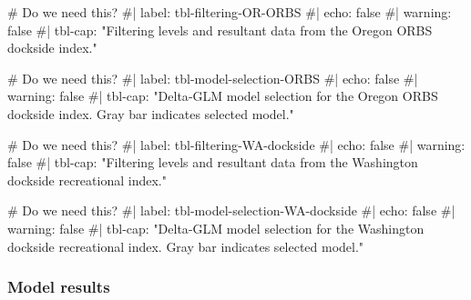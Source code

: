 \documentclass[
]{scrartcl}
\newenvironment{Shaded}{\begin{snugshade}}{\end{snugshade}}
\newcommand{\CommentTok}[1]{\textcolor[rgb]{0.37,0.37,0.37}{#1}}
\begin{document}
\begin{Shaded}
\begin{Highlighting}[]
\CommentTok{\# Do we need this?}
\CommentTok{\#| label: tbl{-}filtering{-}OR{-}ORBS}
\CommentTok{\#| echo: false}
\CommentTok{\#| warning: false}
\CommentTok{\#| tbl{-}cap: "Filtering levels and resultant data from the Oregon ORBS dockside index."}
\end{Highlighting}
\end{Shaded}

\begin{Shaded}
\begin{Highlighting}[]
\CommentTok{\# Do we need this?}
\CommentTok{\#| label: tbl{-}model{-}selection{-}ORBS}
\CommentTok{\#| echo: false}
\CommentTok{\#| warning: false}
\CommentTok{\#| tbl{-}cap: "Delta{-}GLM model selection for the Oregon ORBS dockside index. Gray bar indicates selected model."}
\end{Highlighting}
\end{Shaded}

\begin{Shaded}
\begin{Highlighting}[]
\CommentTok{\# Do we need this?}
\CommentTok{\#| label: tbl{-}filtering{-}WA{-}dockside}
\CommentTok{\#| echo: false}
\CommentTok{\#| warning: false}
\CommentTok{\#| tbl{-}cap: "Filtering levels and resultant data from the Washington dockside recreational index."}
\end{Highlighting}
\end{Shaded}

\begin{Shaded}
\begin{Highlighting}[]
\CommentTok{\# Do we need this?}
\CommentTok{\#| label: tbl{-}model{-}selection{-}WA{-}dockside}
\CommentTok{\#| echo: false}
\CommentTok{\#| warning: false}
\CommentTok{\#| tbl{-}cap: "Delta{-}GLM model selection for the Washington dockside recreational index. Gray bar indicates selected model."}
\end{Highlighting}
\end{Shaded}

\subsubsection{Model results}\label{model-results}

\begingroup
\fontsize{9.0pt}{10.8pt}\selectfont
\end{document}
